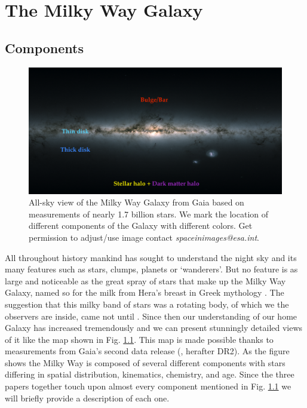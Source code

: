 \chapter{The Milky Way Galaxy}\label{chap:milkyway}
\section{Components}\label{sec:components}
\begin{figure}[t]
    \centering
    \includegraphics[width=1\textwidth]{images/gaiasky.png}
    \caption{All-sky view of the Milky Way Galaxy from Gaia based on measurements of nearly 1.7 billion stars. We mark the location of different components of the Galaxy with different colors. {\color{red} Get permission to adjust/use image contact \textit{spaceinimages@esa.int}}.} %
    \label{fig:gaiasky}
\end{figure}
All throughout history mankind has sought to understand the night sky and its many features such as stars, clumps, planets or `wanderers'. But no feature is as large and noticeable as the great spray of stars that make up the Milky Way Galaxy, named so for the milk from Hera's breast in Greek mythology \citep{leeming:98}. The suggestion that this milky band of stars was a rotating body, of which we the observers are inside, came not until \cite{wright:1750}. Since then our understanding of our home Galaxy has increased tremendously and we can present stunningly detailed views of it like the map shown in Fig. \ref{fig:gaiasky}. This map is made possible thanks to measurements from Gaia's second data release (\citealt{dr2},  herafter DR2). As the figure shows the Milky Way is composed of several different components with stars differing in spatial distribution, kinematics, chemistry, and age. Since the three papers together touch upon almost every component mentioned in Fig. \ref{fig:gaiasky} we will briefly provide a description of each one.


